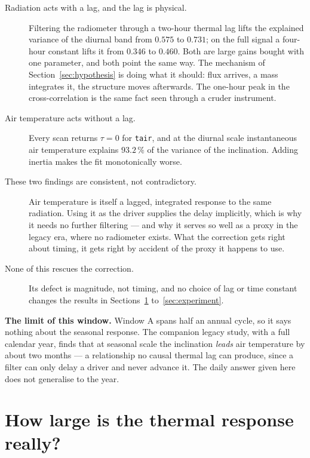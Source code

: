 \documentclass[11pt,a4paper]{article}
\begin{document}
\begin{description}
\item[Radiation acts with a lag, and the lag is physical.] Filtering the radiometer
through a two-hour thermal lag lifts the explained variance of the diurnal band from
$0.575$ to $0.731$; on the full signal a four-hour constant lifts it from $0.346$ to
$0.460$. Both are large gains bought with one parameter, and both point the same way.
The mechanism of Section~\ref{sec:hypothesis} is doing what it should: flux arrives, a
mass integrates it, the structure moves afterwards. The one-hour peak in the
cross-correlation is the same fact seen through a cruder instrument.
\item[Air temperature acts without a lag.] Every scan returns $\tau = 0$ for
\texttt{tair}, and at the diurnal scale instantaneous air temperature explains
$93.2\,\%$ of the variance of the inclination. Adding inertia makes the fit
monotonically worse.
\item[These two findings are consistent, not contradictory.] Air temperature is itself
a lagged, integrated response to the same radiation. Using it as the driver supplies the
delay implicitly, which is why it needs no further filtering --- and why it serves so
well as a proxy in the legacy era, where no radiometer exists. What the correction gets
right about timing, it gets right by accident of the proxy it happens to use.
\item[None of this rescues the correction.] Its defect is magnitude, not timing, and no
choice of lag or time constant changes the results in Sections~\ref{sec:size}
to~\ref{sec:experiment}.
\end{description}

\noindent\textbf{The limit of this window.} Window A spans half an annual cycle, so it
says nothing about the seasonal response. The companion legacy study, with a full
calendar year, finds that at seasonal scale the inclination \emph{leads} air
temperature by about two months --- a relationship no causal thermal lag can produce,
since a filter can only delay a driver and never advance it. The daily answer given
here does not generalise to the year.

\section{How large is the thermal response really?}
\label{sec:size}
\end{document}

